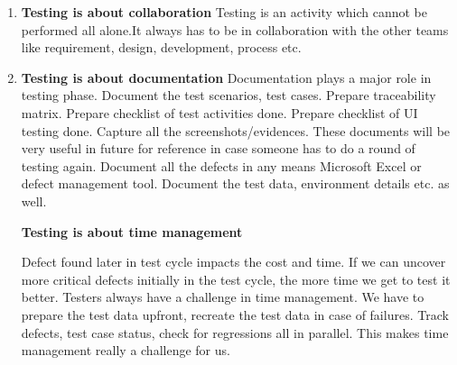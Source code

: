 \begin{enumerate}
\item\textbf{Testing is about collaboration}
Testing is an activity which cannot be performed all alone.It always has to be in collaboration with the other teams like requirement, design, development, process etc.

\item\textbf{Testing is about documentation}
Documentation plays a major role in testing phase. Document the test scenarios, test cases. Prepare traceability matrix. Prepare checklist of test activities done. Prepare checklist of UI testing done. Capture all the screenshots/evidences. These documents will be very useful in future for reference in case someone has to do a round of testing again. Document all the defects in any means Microsoft Excel or defect management tool. Document the test data, environment details etc. as well.

\textbf{Testing is about time management }

Defect found later in test cycle impacts the cost and time. If we can uncover more critical defects initially in the test cycle, the more time we get to test it better. Testers always have a challenge in time management. We have to prepare the test data upfront, recreate the test data in case of failures. Track defects, test case status, check for regressions all in parallel. This makes time management really a challenge for us.


\end{enumerate}

